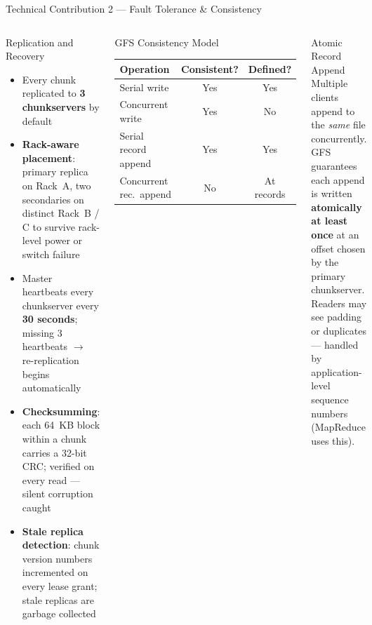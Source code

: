 \documentclass[aspectratio=169,10pt]{beamer}
\begin{document}
\begin{frame}{Technical Contribution 2 — Fault Tolerance \& Consistency}
  \begin{columns}[T]
      \begin{block}{Replication and Recovery}
        \begin{itemize}
          \item Every chunk replicated to \textbf{3 chunkservers} by default
          \item \textbf{Rack-aware placement}: primary replica on Rack~A,
                two secondaries on distinct Rack~B / C to survive rack-level
                power or switch failure
          \item Master heartbeats every chunkserver every \textbf{30 seconds};
                missing 3 heartbeats $\to$ re-replication begins automatically
          \item \textbf{Checksumming}: each 64~KB block within a chunk carries
                a 32-bit CRC; verified on every read — silent corruption caught
          \item \textbf{Stale replica detection}: chunk version numbers incremented
                on every lease grant; stale replicas are garbage collected
        \end{itemize}
      \end{block}

      \begin{block}{GFS Consistency Model}
        \renewcommand{\arraystretch}{1.3}
        \begin{tabular}{@{}lcc@{}}
          \toprule
          \textbf{Operation} & \textbf{Consistent?} & \textbf{Defined?} \\
          \midrule
          Serial write           & Yes & Yes \\
          Concurrent write       & Yes & No  \\
          Serial record append   & Yes & Yes \\
          Concurrent rec.\ append& No  & At records \\
          \bottomrule
        \end{tabular}
      \end{block}
      \vspace{5pt}
      \begin{exampleblock}{Atomic Record Append}
        Multiple clients append to the \emph{same} file concurrently.
        GFS guarantees each append is written \textbf{atomically at least once}
        at an offset chosen by the primary chunkserver.
        Readers may see padding or duplicates — handled by application-level
        sequence numbers (MapReduce uses this).
      \end{exampleblock}
  \end{columns}
\end{frame}
\end{document}
